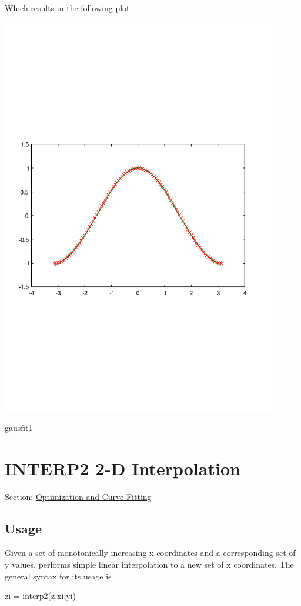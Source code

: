 Which results in the following plot  
\begin{DoxyImage}
\includegraphics[width=12cm]{gausfit1}
\caption{gausfit1}
\end{DoxyImage}
 \hypertarget{curvefit_interp2}{}\section{I\-N\-T\-E\-R\-P2 2-\/\-D Interpolation}\label{curvefit_interp2}
Section\-: \hyperlink{sec_curvefit}{Optimization and Curve Fitting} \hypertarget{vtkwidgets_vtkxyplotwidget_Usage}{}\subsection{Usage}\label{vtkwidgets_vtkxyplotwidget_Usage}
Given a set of monotonically increasing {\ttfamily x} coordinates and a corresponding set of {\ttfamily y} values, performs simple linear interpolation to a new set of {\ttfamily x} coordinates. The general syntax for its usage is \begin{DoxyVerb}   zi = interp2(z,xi,yi)
\end{DoxyVerb}
